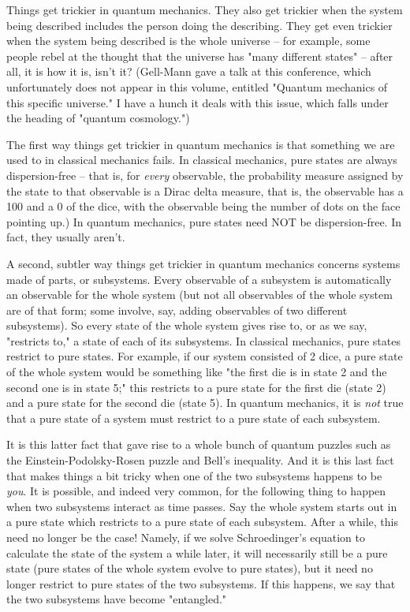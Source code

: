 Things get trickier in quantum mechanics.  They also get trickier
when the system being described includes the person doing the
describing.  They get even trickier when the system being
described is the whole universe -- for example, some people rebel
at the thought that the universe has "many different states" --
after all, it is how it is, isn't it?  (Gell-Mann gave a talk at
this conference, which unfortunately does not appear in this
volume, entitled "Quantum mechanics of this specific universe." 
I have a hunch it deals with this issue, which falls under the
heading of "quantum cosmology.")  

The first way things get trickier in quantum mechanics is that
something we are used to in classical mechanics fails.  In
classical mechanics, pure states are always dispersion-free --
that is, for \emph{every} observable, the probability measure assigned
by the state to that observable is a Dirac delta measure, that
is, the observable has a 100%
and a 0%
of the dice, with the observable being the number of dots on the
face pointing up.)   In quantum mechanics, pure states need NOT
be dispersion-free.  In fact, they usually aren't.  

A second, subtler way things get trickier in quantum mechanics
concerns systems made of parts, or subsystems.  Every observable
of a subsystem is automatically an observable for the whole
system (but not all observables of the whole system are of that
form; some involve, say, adding observables of two different
subsystems).  So every state of the whole system gives rise to,
or as we say, "restricts to," a state of each of its subsystems.
In classical mechanics, pure states restrict to pure states.  For
example, if our system consisted of 2 dice, a pure state of the
whole system would be something like "the first die is in state 2
and the second one is in state 5;" this restricts to a pure state
for the first die (state 2) and a pure state for the second die
(state 5).  In quantum mechanics, it is \emph{not} true that a pure
state of a system must restrict to a pure state of each
subsystem.  

It is this latter fact that gave rise to a whole bunch of quantum
puzzles such as the Einstein-Podolsky-Rosen puzzle and Bell's
inequality.  And it is this last fact that makes things a bit
tricky when one of the two subsystems happens to be \emph{you}.
It is possible, and indeed very common, for the following thing
to happen when two subsystems interact as time passes.  Say the
whole system starts out in a pure state which restricts to a pure
state of each subsystem.  After a while, this need no longer be
the case!  Namely, if we solve Schroedinger's equation to
calculate the state of the system a while later, it will
necessarily still be a pure state (pure states of the whole
system evolve to pure states), but it need no longer restrict to
pure states of the two subsystems.  If this happens, we say that
the two subsystems have become "entangled."  

